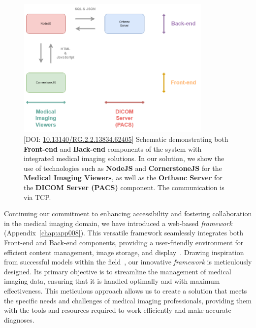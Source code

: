 \begin{figure}[ht]
\centering
\includegraphics[width=0.85\textwidth]{images/fig113}
\caption{[DOI: \href{https://doi.org/10.13140/rg.2.2.13834.62405}{10.13140/RG.2.2.13834.62405}] Schematic demonstrating both {\bf Front-end} and {\bf Back-end} components of the system with integrated medical imaging solutions. In our solution, we show the use of technologies such as {\bf NodeJS} and {\bf CornerstoneJS} for the {\bf Medical Imaging Viewers}, as well as the {\bf Orthanc Server} for the {\bf DICOM Server (PACS)} component. The communication is via TCP.}
\label{fig:fig113}
\end{figure}

\textcolor{revised}{Continuing our commitment to enhancing accessibility and fostering collaboration in the medical imaging domain, we have introduced a web-based {\it framework} (Appendix~\ref{chap:app008}).
This versatile framework seamlessly integrates both Front-end and Back-end components, providing a user-friendly environment for efficient content management, image storage, and display~\cite{WO2022071818A1, 10.1145/3399715.3399744}.
Drawing inspiration from successful models within the field~\cite{HOSTETTER2018811}, our innovative {\it framework} is meticulously designed.
Its primary objective is to streamline the management of medical imaging data, ensuring that it is handled optimally and with maximum effectiveness.
This meticulous approach allows us to create a solution that meets the specific needs and challenges of medical imaging professionals, providing them with the tools and resources required to work efficiently and make accurate diagnoses.}

